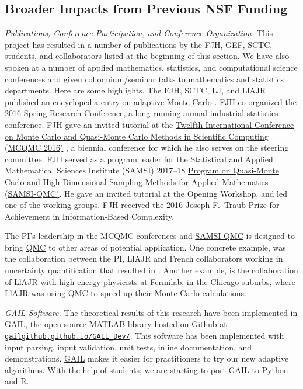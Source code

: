 \documentclass[11pt]{NSFamsart}
\newcommand{\GAIL}{\hyperlink{GAILlink}{GAIL}\xspace}
\newcommand{\QMC}{\hyperlink{QMClink}{QMC}\xspace}
\newcommand{\SAMSIQMC}{\hyperlink{SAMSIlink}{SAMSI-QMC}\xspace}
\begin{document}
\subsection{Broader Impacts from Previous NSF Funding} \label{prevBIsect}

\emph{Publications, Conference Participation, and Conference Organization.} This 
project has resulted in a number of publications by the FJH, GEF, SCTC, students, and collaborators listed at 
the beginning of this section.  We have also spoken at a number of applied mathematics, statistics, 
and computational science conferences and given colloquium/seminar talks to mathematics and 
statistics departments.  Here are some highlights.  The FJH, SCTC, LJ, and LlAJR published  an 
encyclopedia entry on adaptive Monte Carlo \cite{HicEtal18a}.  FJH co-organized the 
\href{http://cos.iit.edu/2016-spring-research-conference/}{2016 Spring Research 
Conference}, a long-running annual industrial statistics conference.   FJH gave an invited tutorial 
at the \href{http://mcqmc2016.stanford.edu}{Twelfth International 
Conference on Monte Carlo and Quasi-Monte Carlo Methods in Scientific Computing (MCQMC 
2016)} 
\cite{Hic17a}, a biennial conference for which he also serves on the steering committee.  FJH 
served as a program leader for the Statistical and Applied Mathematical Sciences 
Institute (SAMSI) 2017--18 
\href{https://www.samsi.info/programs-and-activities/year-long-research-programs/2017-18-program-quasi-monte-carlo-high-dimensional-sampling-methods-applied-mathematics-qmc/
}{Program on Quasi-Monte Carlo and High-Dimensional Sampling Methods for Applied 
	Mathematics (\hypertarget{SAMSIlink}{SAMSI-QMC})}.   He  gave an invited tutorial 
	at the Opening Workshop, and led one of 
	the working groups.  FJH received the 2016 Joseph F.\ Traub 
	Prize for Achievement in Information-Based Complexity.
	
	
The PI's leadership in the MCQMC conferences  and \SAMSIQMC is 
	designed to bring \QMC to other areas of potential application.  One concrete example, was the 
	collaboration between the PI, LlAJR and French collaborators working in uncertainty quantification 
	that resulted in \cite{GilEtal16a, GilJim16b}.  Another example, is the collaboration of LlAJR with 
	high energy physicists at Fermilab, in the Chicago suburbs, where LlAJR was using \QMC to speed 
	up their Monte Carlo calculations.
	
\emph{\GAIL Software.} The theoretical results of this research have been implemented in 
\GAIL, the open source MATLAB library hosted on Github at 
\href{http://gailgithub.github.io/GAIL_Dev/} {\nolinkurl{gailgithub.github.io/GAIL_Dev/}}. This software 
has been implemented with input parsing, input validation, unit tests, inline documentation, and 
demonstrations.  \GAIL makes it easier for practitioners to try our new adaptive algorithms.  With the 
help of students, we are starting to port GAIL to Python and R.
\end{document}
